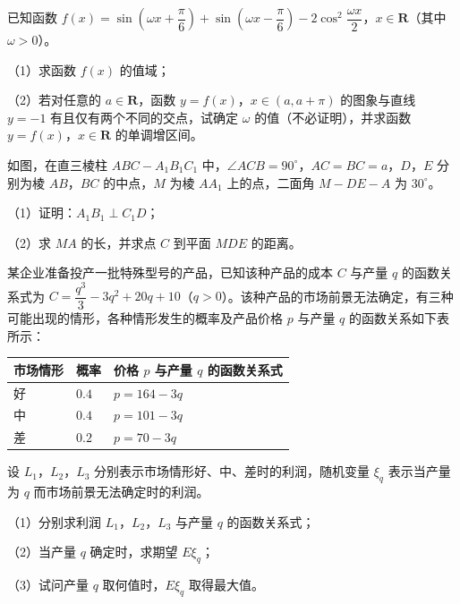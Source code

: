 \begin{question}
已知函数 $f(x)=\sin\left(\omega x+\dfrac{\pi}{6}\right)+\sin\left(\omega x-\dfrac{\pi}{6}\right)-2\cos^2\dfrac{\omega x}{2}$，$x\in\mathbf R$（其中 $\omega>0$）。

（1）求函数 $f(x)$ 的值域；

（2）若对任意的 $a\in\mathbf R$，函数 $y=f(x)$，$x\in(a,a+\pi)$ 的图象与直线 $y=-1$ 有且仅有两个不同的交点，试确定 $\omega$ 的值（不必证明），并求函数 $y=f(x)$，$x\in\mathbf R$ 的单调增区间。

\Needspace{0.4\textheight}
\end{question}
\begin{question}
如图，在直三棱柱 $ABC-A_1B_1C_1$ 中，$\angle ACB=90^\circ$，$AC=BC=a$，$D$，$E$ 分别为棱 $AB$，$BC$ 的中点，$M$ 为棱 $AA_1$ 上的点，二面角 $M-DE-A$ 为 $30^\circ$。

（1）证明：$A_1B_1\perp C_1D$；

（2）求 $MA$ 的长，并求点 $C$ 到平面 $MDE$ 的距离。
\nopagebreak[4]
\begin{center}\end{center}
\nopagebreak[4]
\end{question}
\begingroup
\renewenvironment{question}{\Needspace{0.42\textheight}}{}
\begin{question}
某企业准备投产一批特殊型号的产品，已知该种产品的成本 $C$ 与产量 $q$ 的函数关系式为 $C=\dfrac{q^3}{3}-3q^2+20q+10$（$q>0$）。该种产品的市场前景无法确定，有三种可能出现的情形，各种情形发生的概率及产品价格 $p$ 与产量 $q$ 的函数关系如下表所示：

\begin{center}
\begin{tabular}{lll}
\toprule
市场情形 & 概率 & 价格 $p$ 与产量 $q$ 的函数关系式 \\
\midrule
好 & $0.4$ & $p=164-3q$ \\
中 & $0.4$ & $p=101-3q$ \\
差 & $0.2$ & $p=70-3q$ \\
\bottomrule
\end{tabular}
\end{center}

设 $L_1$，$L_2$，$L_3$ 分别表示市场情形好、中、差时的利润，随机变量 $\xi_q$ 表示当产量为 $q$ 而市场前景无法确定时的利润。

（1）分别求利润 $L_1$，$L_2$，$L_3$ 与产量 $q$ 的函数关系式；

（2）当产量 $q$ 确定时，求期望 $E\xi_q$；

（3）试问产量 $q$ 取何值时，$E\xi_q$ 取得最大值。

\end{question}
